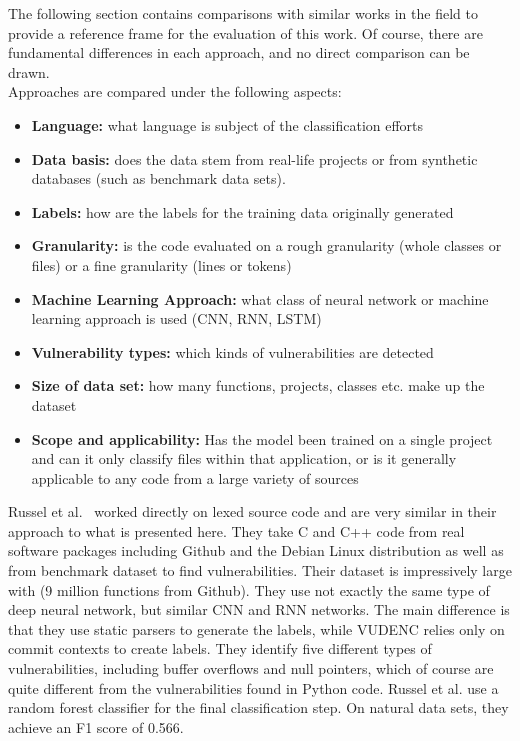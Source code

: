 \documentclass[
a4paper,
pagesize,
pdftex,
12pt,
twoside, %
BCOR=5mm, %
ngerman,
fleqn,
final,
]{scrartcl}
\begin{document}
	The following section contains comparisons with similar works in the field to provide a reference frame for the evaluation of this work. Of course, there are fundamental differences in each approach, and no direct comparison can be drawn.\\
	Approaches are compared under the following aspects:\\
	\begin{itemize}
		\item \textbf{Language:} what language is subject of the classification efforts
		\item \textbf{Data basis:} does the data stem from real-life projects or from synthetic databases (such as benchmark data sets).
		\item \textbf{Labels:} how are the labels for the training data originally generated
		\item \textbf{Granularity:} is the code evaluated on a rough granularity (whole classes or files) or a fine granularity (lines or tokens)
		\item \textbf{Machine Learning Approach:} what class of neural network or machine learning approach is used (CNN, RNN, LSTM)
		\item \textbf{Vulnerability types:} which kinds of vulnerabilities are detected
		\item \textbf{Size of data set:} how many functions, projects, classes etc. make up the dataset
		\item \textbf{Scope and applicability:} Has the model been trained on a single project and can it only classify files within that application, or is it generally applicable to any code from a large variety of sources
	\end{itemize}
	
	
	Russel et al.~\cite{Russell.2018} worked directly on lexed source code and are very similar in their approach to what is presented here. They take C and C++ code from real software packages including Github and the Debian Linux distribution as well as from benchmark dataset to find vulnerabilities. Their dataset is impressively large with (9 million functions from Github). They use not exactly the same type of deep neural network, but similar CNN and RNN networks. The main difference is that they use static parsers to generate the labels, while  VUDENC relies only on commit contexts to create labels. They identify five different types of vulnerabilities, including buffer overflows and null pointers, which of course are quite different from the vulnerabilities found in Python code. Russel et al. use a random forest classifier for the final classification step. On natural data sets, they achieve an F1 score of 0.566.\\
	
\end{document}
